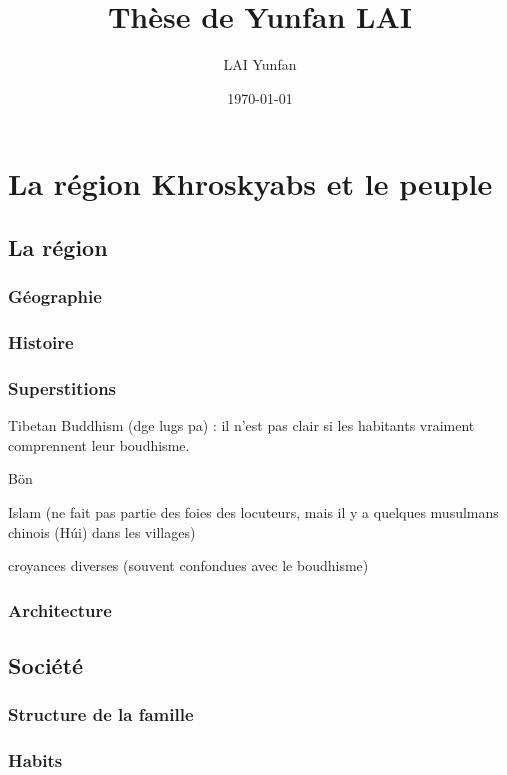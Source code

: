 \documentclass[11pt, a4paper]{book}              %
\title{\bf Thèse de Yunfan LAI}    %
\author{LAI Yunfan}              %
\date{\today}                           %
\begin{document}
\frontmatter                            %
\maketitle                              %
\tableofcontents                        %
\mainmatter                             %
\part{La région Khroskyabs et le peuple}     
\chapter{La région}              %
\section{Géographie}                %
\section{Histoire}
\section{Superstitions}

Tibetan Buddhism (dge lugs pa) : il n'est pas clair si les habitants vraiment comprennent leur boudhisme.

Bön 

Islam (ne fait pas partie des foies des locuteurs, mais il y a quelques musulmans chinois (Húi) dans les villages)

croyances diverses (souvent confondues avec le boudhisme)


\section{Architecture}
\chapter{Société}
\section{Structure de la famille}
\section{Habits}
\end{document}
